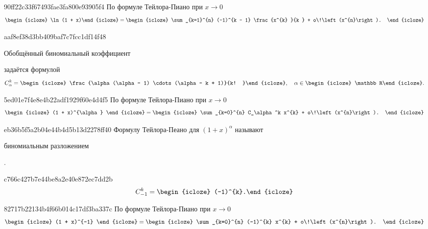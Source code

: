 \begin{note}{90ff22c33f67493fae3fa800e93905f4}
    По формуле Тейлора-Пиано при \( x \to 0 \)
    \[
        \begin{icloze}{2}\ln (1 + x)\end{icloze} = \begin{icloze}{1}\sum_{k=1}^{n} (-1)^{k - 1} \frac{x^{k} }{k } + o\!\left(x^{n}\right). \end{icloze}
    \]
\end{note}

\begin{note}{aaf8ef38d3bb409baf7c7fcc1df14f48}
    \begin{icloze}{3}Обобщённый биномиальный коэффициент\end{icloze} задаётся формулой
    \[
        C_\alpha^k = \begin{icloze}{1}\frac{\alpha(\alpha - 1) \cdots (\alpha - k + 1)}{k! }\end{icloze}, \quad \alpha \in \begin{icloze}{2}\mathbb R\end{icloze}.
    \]
\end{note}

\begin{note}{5ed01e7f4e8e4b22adf1929f60e4d4f5}
    По формуле Тейлора-Пиано при \( x \to 0 \)
    \[
        \begin{icloze}{2}(1 + x)^{\alpha} \end{icloze} = \begin{icloze}{1}\sum_{k=0}^{n} C_\alpha^k x^{k} + o\!\left(x^{n}\right). \end{icloze}
    \]
\end{note}

\begin{note}{eb36b5f5a2b04e44b4d5b13d2278ff40}
    Формулу Тейлора-Пеано для \( (1 + x)^{\alpha} \) называют \begin{icloze}{1}биномиальным разложением\end{icloze}.
\end{note}

\begin{note}{c766c427b7e44be8a2e40e872ec7dd2b}
    \[
        C_{-1}^{k} = \begin{icloze}{1}(-1)^{k}.\end{icloze}
    \]
\end{note}

\begin{note}{82717b22134b4f66b014c17df3ba337c}
    По формуле Тейлора-Пиано при \( x \to 0 \)
    \[
        \begin{icloze}{2}(1 + x)^{-1} \end{icloze} = \begin{icloze}{1}\sum_{k=0}^{n} (-1)^{k} x^{k} + o\!\left(x^{n}\right). \end{icloze}
    \]
\end{note}

